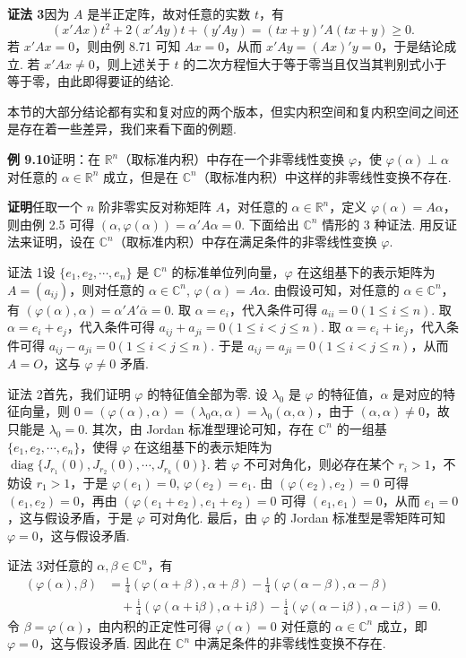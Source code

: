 \documentclass[UTF8, 12pt, fontset=fandol, oneside]{ctexart}
\begin{document}
\noindent\textbf{证法 3}\quad 因为 $A$ 是半正定阵，故对任意的实数 $t$，有
\[
(x'Ax)t^2+2(x'Ay)t+(y'Ay)=(tx+y)'A(tx+y)\ge 0.
\]
若 $x'Ax=0$，则由例 8.71 可知 $Ax=0$，从而 $x'Ay=(Ax)'y=0$，于是结论成立. 若 $x'Ax\ne 0$，则上述关于 $t$ 的二次方程恒大于等于零当且仅当其判别式小于等于零，由此即得要证的结论.

本节的大部分结论都有实和复对应的两个版本，但实内积空间和复内积空间之间还是存在着一些差异，我们来看下面的例题.

\noindent\textbf{例 9.10}\quad 证明：在 $\mathbb{R}^n$（取标准内积）中存在一个非零线性变换 $\varphi$，使 $\varphi(\alpha)\perp\alpha$ 对任意的 $\alpha\in\mathbb{R}^n$ 成立，但是在 $\mathbb{C}^n$（取标准内积）中这样的非零线性变换不存在.

\noindent\textbf{证明}\quad 任取一个 $n$ 阶非零实反对称矩阵 $A$，对任意的 $\alpha\in\mathbb{R}^n$，定义 $\varphi(\alpha)=A\alpha$，则由例 2.5 可得 $(\alpha,\varphi(\alpha))=\alpha'A\alpha=0$. 下面给出 $\mathbb{C}^n$ 情形的 3 种证法. 用反证法来证明，设在 $\mathbb{C}^n$（取标准内积）中存在满足条件的非零线性变换 $\varphi$.

证法 1\quad 设 $\{e_1,e_2,\cdots,e_n\}$ 是 $\mathbb{C}^n$ 的标准单位列向量，$\varphi$ 在这组基下的表示矩阵为 $A=(a_{ij})$，则对任意的 $\alpha\in\mathbb{C}^n$, $\varphi(\alpha)=A\alpha$. 由假设可知，对任意的 $\alpha\in\mathbb{C}^n$，有 $(\varphi(\alpha),\alpha)=\alpha'A'\overline{\alpha}=0$. 取 $\alpha=e_i$，代入条件可得 $a_{ii}=0(1\le i\le n)$. 取 $\alpha=e_i+e_j$，代入条件可得 $a_{ij}+a_{ji}=0(1\le i<j\le n)$. 取 $\alpha=e_i+\mathrm{i}e_j$，代入条件可得 $a_{ij}-a_{ji}=0(1\le i<j\le n)$. 于是 $a_{ij}=a_{ji}=0(1\le i<j\le n)$，从而 $A=O$，这与 $\varphi\ne 0$ 矛盾.

证法 2\quad 首先，我们证明 $\varphi$ 的特征值全部为零. 设 $\lambda_0$ 是 $\varphi$ 的特征值，$\alpha$ 是对应的特征向量，则 $0=(\varphi(\alpha),\alpha)=(\lambda_0\alpha,\alpha)=\lambda_0(\alpha,\alpha)$，由于 $(\alpha,\alpha)\ne 0$，故只能是 $\lambda_0=0$. 其次，由 Jordan 标准型理论可知，存在 $\mathbb{C}^n$ 的一组基 $\{e_1,e_2,\cdots,e_n\}$，使得 $\varphi$ 在这组基下的表示矩阵为 $\operatorname{diag}\{J_{r_1}(0),J_{r_2}(0),\cdots,J_{r_k}(0)\}$. 若 $\varphi$ 不可对角化，则必存在某个 $r_i>1$，不妨设 $r_1>1$，于是 $\varphi(e_1)=0$, $\varphi(e_2)=e_1$. 由 $(\varphi(e_2),e_2)=0$ 可得 $(e_1,e_2)=0$，再由 $(\varphi(e_1+e_2),e_1+e_2)=0$ 可得 $(e_1,e_1)=0$，从而 $e_1=0$，这与假设矛盾，于是 $\varphi$ 可对角化. 最后，由 $\varphi$ 的 Jordan 标准型是零矩阵可知 $\varphi=0$，这与假设矛盾.

证法 3\quad 对任意的 $\alpha,\beta\in\mathbb{C}^n$，有
\[
\begin{aligned}
(\varphi(\alpha),\beta)
&=\frac14(\varphi(\alpha+\beta),\alpha+\beta)-\frac14(\varphi(\alpha-\beta),\alpha-\beta)\\
&\quad+\frac{\mathrm{i}}4(\varphi(\alpha+\mathrm{i}\beta),\alpha+\mathrm{i}\beta)
-\frac{\mathrm{i}}4(\varphi(\alpha-\mathrm{i}\beta),\alpha-\mathrm{i}\beta)=0.
\end{aligned}
\]
令 $\beta=\varphi(\alpha)$，由内积的正定性可得 $\varphi(\alpha)=0$ 对任意的 $\alpha\in\mathbb{C}^n$ 成立，即 $\varphi=0$，这与假设矛盾. 因此在 $\mathbb{C}^n$ 中满足条件的非零线性变换不存在.
\end{document}
